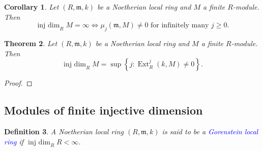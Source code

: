 \documentclass[10pt]{article}
\theoremstyle{thmstyle}
\newtheorem{theorem}{Theorem}[section]
\theoremstyle{defstyle}
\newtheorem{definition}[theorem]{Definition}
\newtheorem{corollary}[theorem]{Corollary}
\newcommand{\frakm}{\mathfrak{m}} %
\newcommand{\define}[1]{\textcolor{blue}{\textit{#1}}}
\renewcommand{\ge}{\geqslant}
\newcommand{\Ext}{\operatorname{Ext}}
\newcommand{\injdim}{\operatorname{inj~dim}}
\begin{document}
\begin{corollary}
    Let $(R, \frakm, k)$ be a Noetherian local ring and $M$ a finite $R$-module. Then 
    \begin{equation*}
        \injdim_R M = \infty \iff \mu_j(\frakm, M)\ne 0 \text{ for infinitely many }j\ge 0.
    \end{equation*}
\end{corollary}


\begin{theorem}
    Let $(R,\frakm, k)$ be a Noetherian local ring and $M$ a finite $R$-module. Then 
    \begin{equation*}
        \injdim_R M = \sup\left\{j\colon \Ext^j_R(k, M)\ne 0\right\}.
    \end{equation*}
\end{theorem}
\begin{proof}
\end{proof}

\subsection{Modules of finite injective dimension}

\begin{definition}
    A Noetherian local ring $(R,\frakm, k)$ is said to be a \define{Gorenstein local ring} if $\injdim_R R < \infty$.
\end{definition}
\end{document}
